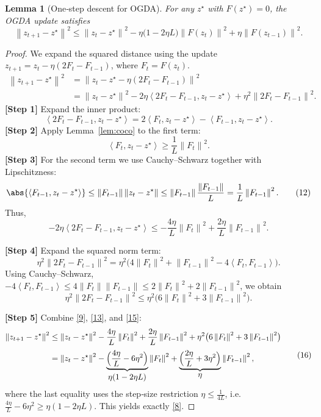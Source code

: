 \documentclass{article}
\newtheorem{lemma}{Lemma}
\newcommand{\norm}[1]{\left\lVert#1\right\rVert}
\newcommand{\inner}[2]{\left\langle #1,#2 \right\rangle}
\begin{document}
\begin{lemma}[One‑step descent for OGDA]\label{lem:descent}
For any $z^{\star}$ with $F(z^{\star})=0$, the OGDA update satisfies
\[
\norm{z_{t+1}-z^{\star}}^{2}
\le
\norm{z_{t}-z^{\star}}^{2}
- \eta\bigl(1-2\eta L\bigr)\norm{F(z_{t})}^{2}
+ \eta\norm{F(z_{t-1})}^{2}.
\tag{8}
\]
\end{lemma}
\begin{proof}
We expand the squared distance using the update $z_{t+1}=z_{t}-\eta(2F_{t}-F_{t-1})$, where $F_{t}=F(z_{t})$.
\[
\begin{aligned}
\norm{z_{t+1}-z^{\star}}^{2}
&=\norm{z_{t}-z^{\star}-\eta(2F_{t}-F_{t-1})}^{2}\\[1mm]
&=\norm{z_{t}-z^{\star}}^{2}
-2\eta\inner{2F_{t}-F_{t-1}}{z_{t}-z^{\star}}
+\eta^{2}\norm{2F_{t}-F_{t-1}}^{2}.
\end{aligned}
\tag{9}
\]
\textbf{[Step 1]} Expand the inner product:
\[
\inner{2F_{t}-F_{t-1}}{z_{t}-z^{\star}}
=2\inner{F_{t}}{z_{t}-z^{\star}}-\inner{F_{t-1}}{z_{t}-z^{\star}}.
\tag{10}
\]
\textbf{[Step 2]} Apply Lemma~\ref{lem:coco} to the first term:
\[
\inner{F_{t}}{z_{t}-z^{\star}}\ge\frac{1}{L}\norm{F_{t}}^{2}.
\tag{11}
\]
\textbf{[Step 3]} For the second term we use Cauchy–Schwarz together with Lipschitzness:
\[
\abs{\inner{F_{t-1}}{z_{t}-z^{\star}}}
\le \norm{F_{t-1}}\norm{z_{t}-z^{\star}}
\le \norm{F_{t-1}}\frac{\norm{F_{t-1}}}{L}
= \frac{1}{L}\norm{F_{t-1}}^{2}.
\tag{12}
\]
Thus,
\[
-2\eta\inner{2F_{t}-F_{t-1}}{z_{t}-z^{\star}}
\le -\frac{4\eta}{L}\norm{F_{t}}^{2}
+\frac{2\eta}{L}\norm{F_{t-1}}^{2}.
\tag{13}
\]

\textbf{[Step 4]} Expand the squared norm term:
\[
\eta^{2}\norm{2F_{t}-F_{t-1}}^{2}
= \eta^{2}\bigl(4\norm{F_{t}}^{2}+\norm{F_{t-1}}^{2}-4\inner{F_{t}}{F_{t-1}}\bigr).
\tag{14}
\]
Using Cauchy–Schwarz, $-4\inner{F_{t}}{F_{t-1}}\le 4\norm{F_{t}}\norm{F_{t-1}}\le 2\norm{F_{t}}^{2}+2\norm{F_{t-1}}^{2}$, we obtain
\[
\eta^{2}\norm{2F_{t}-F_{t-1}}^{2}
\le \eta^{2}\bigl(6\norm{F_{t}}^{2}+3\norm{F_{t-1}}^{2}\bigr).
\tag{15}
\]

\textbf{[Step 5]} Combine \eqref{9}, \eqref{13}, and \eqref{15}:
\[
\begin{aligned}
\norm{z_{t+1}-z^{\star}}^{2}
&\le \norm{z_{t}-z^{\star}}^{2}
-\frac{4\eta}{L}\norm{F_{t}}^{2}
+\frac{2\eta}{L}\norm{F_{t-1}}^{2}
+\eta^{2}\bigl(6\norm{F_{t}}^{2}+3\norm{F_{t-1}}^{2}\bigr)\\[1mm]
&= \norm{z_{t}-z^{\star}}^{2}
-\underbrace{\Bigl(\frac{4\eta}{L}-6\eta^{2}\Bigr)}_{\displaystyle \eta(1-2\eta L)}\norm{F_{t}}^{2}
+\underbrace{\Bigl(\frac{2\eta}{L}+3\eta^{2}\Bigr)}_{\displaystyle \eta}\norm{F_{t-1}}^{2},
\end{aligned}
\tag{16}
\]
where the last equality uses the step‑size restriction $\eta\le\frac{1}{4L}$, i.e. $\frac{4\eta}{L}-6\eta^{2}\ge \eta(1-2\eta L)$. This yields exactly \eqref{8}. \hfill\qedsymbol
\end{proof}
\end{document}
